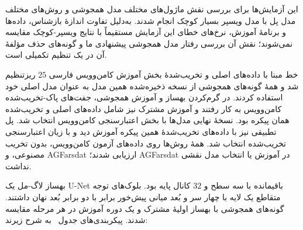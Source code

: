 
این آزمایش‌ها برای بررسی نقش ماژول‌های مختلف مدل همجوشی و روش‌های مختلف مدل پل با مدل ویسپر بسیار کوچک انجام شدند. به‌دلیل تفاوت اندازهٔ بازشناس، داده‌ها و برنامهٔ آموزش، نرخ‌های خطای این آزمایش مستقیماً با نتایج ویسپر-کوچک مقایسه نمی‌شوند؛ نقش آن بررسی رفتار مدل همجوشی پیشنهادی ما و گونه‌های حذف مؤلفهٔ آن در یک تنظیم تکمیلی است.

خط مبنا با داده‌های اصلی و تخریب‌شدهٔ بخش آموزش کامن‌وویس فارسی $25$ ریزتنظیم شد و همهٔ گونه‌های همجوشی از نسخه ذخیره‌شده همین مدل به عنوان مدل اصلی خود استفاده کردند. در گرم‌کردن بهساز و آموزش همجوشی، جفت‌های پاک-تخریب‌شده کامن‌وویس به کار رفتند و آموزش مشترک نیز شامل داده‌های اصلی و تخریب‌شده همان پیکره بود. نسخهٔ نهایی مدل‌ها با بخش اعتبارسنجی کامن‌وویس انتخاب شد. پل تطبیقی نیز با داده‌های تخریب‌شدهٔ همین پیکره آموزش دید و با زیان اعتبارسنجی تخریب‌شده انتخاب شد. همهٔ روش‌ها روی داده‌های آزمون کامن‌وویس، بدون تخریب مصنوعی، و AGFarsdat ارزیابی شدند؛ AGFarsdat در آموزش یا انتخاب مدل نقشی نداشت.

بهساز لاگ-مل یک U-Net باقیمانده با سه سطح و $32$ کانال پایه بود. بلوک‌های توجه متقاطع یک لایه با چهار سر و بُعد میانی پیش‌خور برابر با دو برابر بُعد نهان داشتند. گونه‌های همجوشی با بهساز اولیهٔ مشترک و یک دوره آموزش در هر مرحله مقایسه شدند. پیکربندی‌های جدول~ به شرح زیرند:


